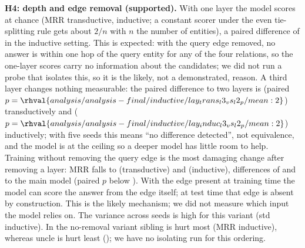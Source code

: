 \vspace{4pt}\noindent\textbf{H4: depth and edge removal (supported).} With one layer the model scores at chance (MRR  transductive,  inductive; a constant scorer under the even tie-splitting rule gets about $2/n$ with $n$ the number of entities), a paired difference of  in the inductive setting. This is expected: with the query edge removed, no answer is within one hop of the query entity for any of the four relations, so the one-layer scores carry no information about the candidates; we did not run a probe that isolates this, so it is the likely, not a demonstrated, reason. A third layer changes nothing measurable: the paired difference to two layers is  (paired $p=\rhval{analysis/analysis-final/inductive/lay_trans_l3_vs_l2_p/mean:2}$) transductively and  ($p=\rhval{analysis/analysis-final/inductive/lay_induc_l3_vs_l2_p/mean:2}$) inductively; with five seeds this means ``no difference detected'', not equivalence, and the model is at the ceiling so a deeper model has little room to help. Training without removing the query edge is the most damaging change after removing a layer: MRR falls to  (transductive) and  (inductive), differences of  and  to the main model (paired $p$ below ). With the edge present at training time the model can score the answer from the edge itself; at test time that edge is absent by construction. This is the likely mechanism; we did not measure which input the model relies on. The variance across seeds is high for this variant (std  inductive). In the no-removal variant sibling is hurt most (MRR  inductive), whereas uncle is hurt least (); we have no isolating run for this ordering.

